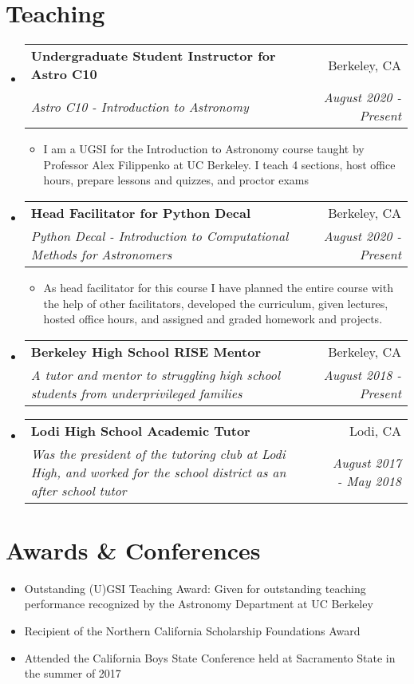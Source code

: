 \documentclass[letterpaper,10pt]{article}
\makeatletter
\newcommand{\resumeSubheading}[4]{
  \vspace{-1pt}\item[]
  \begin{tabular*}{0.98\textwidth}{l@{\extracolsep{\fill}}r}
      \hspace{-10pt}\textbf{#1} & #2 \\
      \hspace{-10pt}\textit{\small#3} & \textit{\small #4} \\
    \end{tabular*}\vspace{-5pt}
}
\newcommand{\resumeSubHeadingListStart}{\begin{itemize}[leftmargin=*]}
\newcommand{\resumeSubHeadingListEnd}{\end{itemize}}
\newcommand{\shorterSection}[1]{\vspace{-10pt}\section{#1}}
\makeatother
\begin{document}
\shorterSection{Teaching}
\resumeSubHeadingListStart
\resumeSubheading
{Undergraduate Student Instructor for Astro C10}{Berkeley, CA}{Astro C10 - Introduction to Astronomy}{August 2020 - Present}
\begin{itemize}
    \item I am a UGSI for the Introduction to Astronomy course taught by Professor Alex Filippenko at UC Berkeley. I teach 4 sections, host office hours, prepare lessons and quizzes, and proctor exams
\end{itemize}
      
\resumeSubheading
{Head Facilitator for Python Decal}{Berkeley, CA}{Python Decal - Introduction to Computational Methods for Astronomers}{August 2020 - Present}
\begin{itemize}
    \item As head facilitator for this course I have planned the entire course with the help of other facilitators, developed the curriculum, given lectures, hosted office hours, and assigned and graded homework and projects.
\end{itemize}

\resumeSubheading{Berkeley High School RISE Mentor}{Berkeley, CA}
 {A tutor and mentor to struggling high school students from underprivileged families}{August 2018 - Present}
\resumeSubheading{Lodi High School Academic Tutor}{Lodi, CA}
 {Was the president of the tutoring club at Lodi High, and worked for the school district as an after school tutor}{August 2017 - May 2018}
 \resumeSubHeadingListEnd
 
 
    

\shorterSection{Awards \& Conferences}
  \resumeSubHeadingListStart
  \small
    \item{Outstanding (U)GSI Teaching Award: Given for outstanding teaching performance recognized by the Astronomy Department at UC Berkeley}
    \vspace{-5pt}
    \item{Recipient of the Northern California Scholarship Foundations Award}
    \vspace{-5pt}
    \item{Attended the California Boys State Conference held at Sacramento State in the summer of 2017}
  \resumeSubHeadingListEnd
\end{document}
